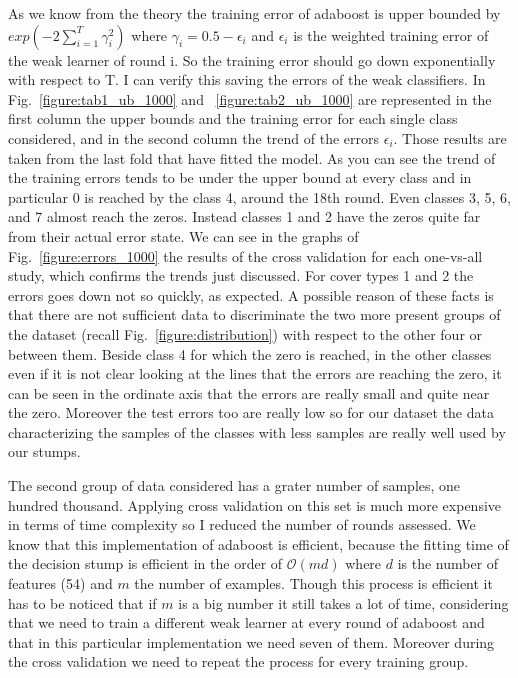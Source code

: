 \documentclass{scrartcl}
\begin{document}
As we know from the theory \cite{boosting-notes} the training error of adaboost is upper bounded by $exp(-2\sum_{i=1}^{T} \gamma_i^2)$ where $\gamma_i = 0.5-\epsilon_i$ and $\epsilon_i$ is the weighted training error of the weak learner of round i. So the training error should go down exponentially with respect to T. I can verify this saving the errors of the weak classifiers. In Fig.~\ref{figure:tab1_ub_1000} and ~\ref{figure:tab2_ub_1000} are represented in the first column the upper bounds and the training error for each single class considered, and in the second column the trend of the errors $\epsilon_i$. Those results are taken from the last fold that have fitted the model. As you can see the trend of the training errors tends to be under the upper bound at every class and in particular 0 is reached by the class 4, around the 18th round. Even classes 3, 5, 6, and 7 almost reach the zeros. Instead classes 1 and 2 have the zeros quite far from their actual error state. We can see in the graphs of Fig.~\ref{figure:errors_1000} the results of the cross validation for each one-vs-all study, which confirms the trends just discussed. For cover types 1 and 2 the errors goes down not so quickly, as expected. A possible reason of these facts is that there are not sufficient data to discriminate the two more present groups of the dataset (recall Fig.~\ref{figure:distribution}) with respect to the other four or between them. Beside class 4 for which the zero is reached, in the other classes even if it is not clear looking at the lines that the errors are reaching the zero, it can be seen in the ordinate axis that the errors are really small and quite near the zero. Moreover the test errors too are really low so for our dataset the data characterizing the samples of the classes with less samples are really well used by our stumps.

The second group of data considered has a grater number of samples, one hundred thousand. Applying cross validation on this set is much more expensive in terms of time complexity so I reduced the number of rounds assessed. We know that this implementation of adaboost is efficient, because the fitting time of the decision stump is efficient in the order of $\mathcal{O}(md)$ where $d$ is the number of features (54) and $m$ the number of examples. Though this process is efficient it has to be noticed that if $m$ is a big number it still takes a lot of time, considering that we need to train a different weak learner at every round of adaboost and that in this particular implementation we need seven of them. Moreover during the cross validation we need to repeat the process for every training group. 
\end{document}
